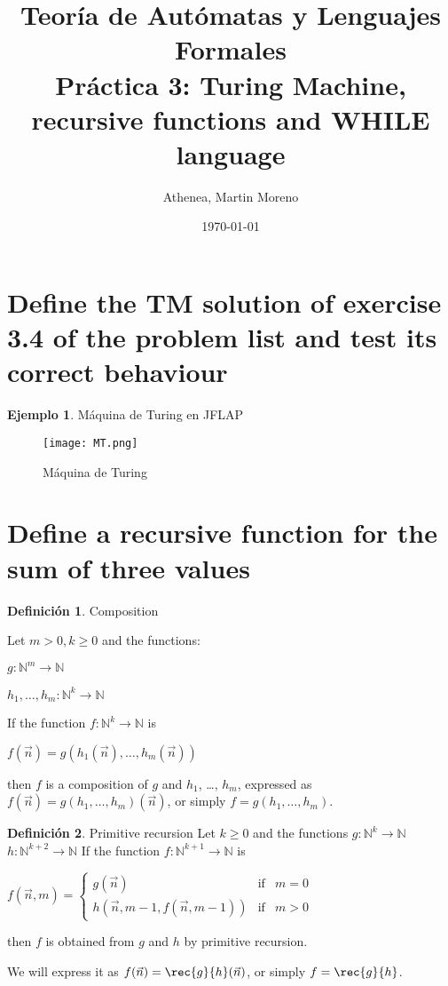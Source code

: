 \documentclass{article}
\title{Teoría de Autómatas y Lenguajes Formales\\[.4\baselineskip]Práctica 3: Turing Machine, recursive functions and WHILE language}
\author{Athenea, Martin Moreno}
\date{\today}
\theoremstyle{plain}
\theoremstyle{definition}
\newtheorem{definition}{Definición}[section]
\newtheorem{example}{Ejemplo}[section]
\begin{document}
\maketitle

\section{Define the TM solution of exercise 3.4 of the problem list and test its correct behaviour}

\begin{example}
Máquina de Turing en JFLAP
\begin{figure}
    \centering
    \texttt{[image: MT.png]}
    \caption{Máquina de Turing}
    \label{fig:my_label}
\end{figure}
\end{example}

\newpage
\section{Define a recursive function for the sum of three values}

\begin{definition}{Composition }

Let $m>0, k\geq0 $ and the functions: 

$g:\mathbb{N}^m \to \mathbb{N}$

$h_1, \dots, h_m: \mathbb{N}^k \to \mathbb{N}$

If the function $f:\mathbb{N}^k\to \mathbb{N}$ is
\begin{center}
    $f(\vec{n})=g(h_1(\vec{n}), \dots, h_m(\vec{n})) $
\end{center}
then $f$ is a composition of $g$ and $h_1$, \dots, $h_m$, 
expressed as $f(\vec{n})=g(h_1, \dots, h_m)(\vec{n})$, or simply $f=g(h_1, \dots, h_m)$.
\end{definition}

\begin{definition}{Primitive recursion }
\newline Let $k\geq 0$ and the functions
\newline $g:\mathbb{N}^k \to \mathbb{N}$
\newline $h:\mathbb{N}^{k+2} \to \mathbb{N}$
\newline If the function $f:\mathbb{N}^{k+1} \to \mathbb{N}$ is
\begin{center}
    $f(\vec{n},m)=\left\{ 
\begin{array}{lcc}
    g(\vec{n})                          & \text{if} & m=0\\
    h(\vec{n},m-1,f(\vec{n},m-1)) & \text{if} & m>0 
\end{array}\right.$
\end{center}

then $f$ is obtained from $g$ and $h$ by primitive recursion.

We will express it as $f(\vec{n})=\rec{g}{h}(\vec{n})$, or simply $f=\rec{g}{h}$.
\end{definition}
\end{document}
